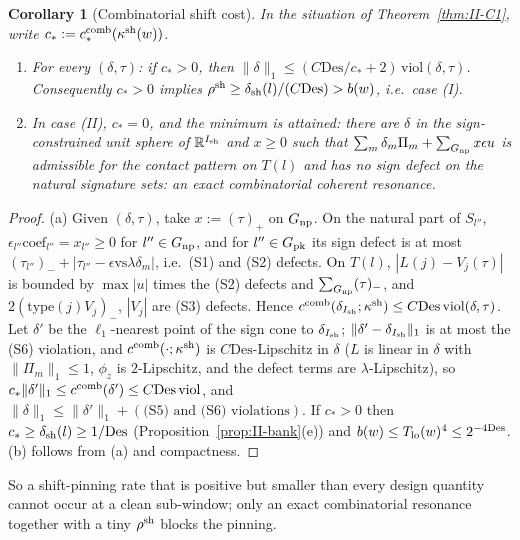 \documentclass[10pt]{amsart}
\newtheorem{corollary}[theorem]{Corollary}
\theoremstyle{definition}
\theoremstyle{remark}
\newcommand{\R}{\mathbb R}
\begin{document}
\begin{corollary}[Combinatorial shift cost]\label{cor:II-C11}
In the situation of Theorem~\textup{\ref{thm:II-C1}}, write $c_*:=c^{\rm
comb}_*(\kappa^{\rm sh}(w))$.
\begin{enumerate}
\item[(a)] For every $(\delta,\tau)$: if $c_*>0$, then $\|\delta\|_1\le(C\mathrm{Des}/c_*
+2)\,\mathrm{viol}(\delta,\tau)$.  Consequently $c_*>0$ implies $\rho^{\rm sh}\ge
\delta_{\rm sh}(l)/(C\mathrm{Des})>b(w)$, i.e.\ case \textup{(I)}.
\item[(b)] In case \textup{(II)}, $c_*=0$, and the minimum is attained: there
are $\delta$ in the sign-constrained unit sphere of $\R^{I_{\rm sh}}$ and
$x\ge0$ such that $\sum_m\delta_m\Pi_m+\sum_{G_{\rm np}}x\epsilon u$ is
admissible for the contact pattern on $T(l)$ and has no sign defect on the
natural signature sets: an \emph{exact combinatorial coherent resonance}.
\end{enumerate}
\end{corollary}

\begin{proof}
(a) Given $(\delta,\tau)$, take $x:=(\tau)_+$ on $G_{\rm np}$.  On the natural
part of $S_{l''}$, $\epsilon_{l''}\mathrm{coef}_{l''}=x_{l''}\ge0$ for $l''\in
G_{\rm np}$, and for $l''\in G_{\rm pk}$ its sign defect is at most
$(\tau_{l''})_-+|\tau_{l''}-\epsilon\mathrm{vs}\lambda\delta_m|$, i.e.\ (S1) and
(S2) defects.  On $T(l)$, $|L(j)-V_j(\tau)|$ is bounded by $\max|u|$ times
the (S2) defects and $\sum_{G_{\rm np}}(\tau)_-$, and $2(\mathrm{type}(j)V_j)_-$,
$|V_j|$ are (S3) defects.  Hence $c^{\rm comb}(\delta_{I_{\rm sh}};\kappa^{\rm
sh})\le C\mathrm{Des}\,\mathrm{viol}(\delta,\tau)$.  Let $\delta'$ be the
$\ell_1$-nearest point of the sign cone to $\delta_{I_{\rm sh}}$; $\|\delta'-
\delta_{I_{\rm sh}}\|_1$ is at most the (S6) violation, and $c^{\rm comb}(\cdot;
\kappa^{\rm sh})$ is $C\mathrm{Des}$-Lipschitz in $\delta$ ($L$ is linear in
$\delta$ with $\|\Pi_m\|_1\le1$, $\phi_z$ is $2$-Lipschitz, and the defect terms
are $\lambda$-Lipschitz), so $c_*\|\delta'\|_1\le c^{\rm comb}(\delta')\le
C\mathrm{Des}\,\mathrm{viol}$, and $\|\delta\|_1\le\|\delta'\|_1+(\text{(S5) and
(S6) violations})$.  If $c_*>0$ then $c_*\ge\delta_{\rm sh}(l)\ge1/\mathrm{Des}$
(Proposition~\ref{prop:II-bank}(e)) and $b(w)\le T_{\rm lo}(w)^4\le2^{-4\mathrm{
Des}}$.  (b) follows from (a) and compactness.
\end{proof}

So a shift-pinning rate that is positive but smaller than every design
quantity cannot occur at a clean sub-window; only an exact combinatorial
resonance together with a tiny $\rho^{\rm sh}$ blocks the pinning.
\end{document}
